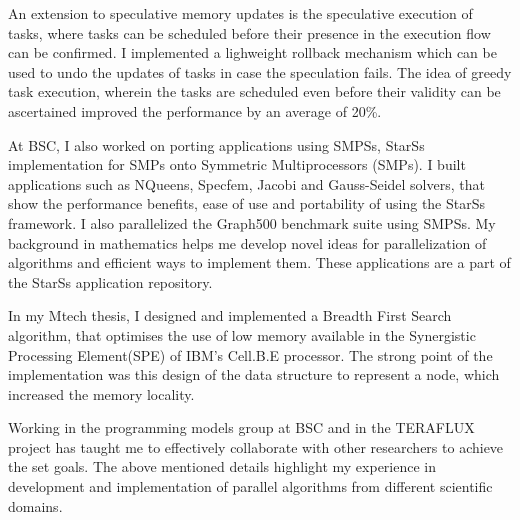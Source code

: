 \documentclass[10pt,stdletter,dateno]{newlfm}
\begin{document}
\begin{newlfm}
%
	   \par
	   An extension to speculative memory updates is the speculative execution of tasks, where tasks can be scheduled before their presence in the execution flow can be confirmed.
	   I implemented a lighweight rollback mechanism which can be used to undo the updates of tasks in case the speculation fails.
	   The idea of greedy task execution, wherein the tasks are scheduled even before their validity can be ascertained improved the performance by an average of 20\%. 
%
	   \par
	   At BSC, I also worked on porting applications using SMPSs, StarSs implementation for SMPs onto Symmetric Multiprocessors (SMPs).
	   I built applications such as NQueens, Specfem, Jacobi and Gauss-Seidel solvers, that show the performance benefits, ease of use and portability of using the StarSs framework. 
	   I also parallelized the Graph500 benchmark suite using SMPSs.
	   My background in mathematics helps me develop novel ideas for parallelization of algorithms and efficient ways to implement them. 
	   These applications are a part of the StarSs application repository. 
%
	   \par
	   In my Mtech thesis, I designed and implemented a Breadth First Search algorithm, that optimises the use of low memory available in the Synergistic Processing Element(SPE) of IBM's Cell.B.E processor. 
	   The strong point of the implementation was this design of the data structure to represent a node, which increased the memory locality.
%
	   \par
	   Working in the programming models group at BSC and in the TERAFLUX project has taught me to effectively collaborate with other researchers to achieve the set goals.
	   The above mentioned details highlight my experience in development and implementation of parallel algorithms from different scientific domains.

\end{newlfm}
\end{document}
